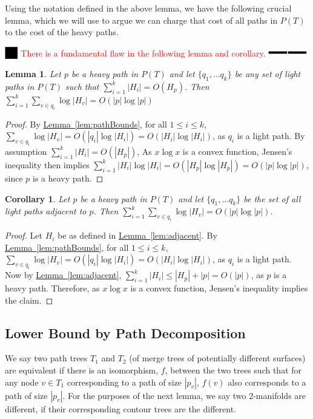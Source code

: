 \documentclass[11pt]{article}
\newtheorem{lemma}[theorem]{Lemma}
\newtheorem{corollary}[theorem]{Corollary}
\theoremstyle{definition}
\newcommand{\Lem}[1]{\hyperref[lem:#1]{Lemma~\ref*{lem:#1}}} %
\newcommand{\XSays}[2]{{
      {$\rule[-0.12cm]{0.2in}{0.5cm}$\fbox{\tt
            #1:} }
      \textcolor{red}{#2}
      \marginpar{\textcolor{blue}{#1}}
      {$\rule[0.1cm]{0.3in}{0.1cm}$\fbox{\tt
            end}$\rule[0.1cm]{0.3in}{0.1cm}$}
      }
   }
\newcommand{\Ben}[1]{{\XSays{Ben}{#1}}}
\begin{document}
Using the notation defined in the above lemma, we have the following crucial lemma, which we will use to 
argue we can charge that cost of all paths in $P(T)$ to the cost of the heavy paths.

\Ben{There is a fundamental flaw in the following lemma and corollary.}

\begin{lemma}
Let $p$ be a heavy path in $P(T)$ and let $\{q_1, \dots q_k\}$ be any set of light paths in $P(T)$ such that 
$\sum_{i=1}^k |H_i| = O(H_p)$.  Then $\sum_{i=1}^k \sum_{v\in q_i} \log |H_v| = O(|p|\log |p|)$
\end{lemma}
\begin{proof}
By \Lem{pathBounds}, for all $1\leq i\leq k$, 
 $\sum_{v\in q_i} \log |H_v| = O(|q_i|\log |H_i|) = O(|H_i|\log |H_i|)$, as $q_i$ is a light path.
 By assumption $\sum_{i=1}^k |H_i| = O(|H_p|)$, 
 As $x\log x$ is a convex function, Jensen's inequality then implies 
 $\sum_{i=1}^{k} |H_i|\log |H_i| = O(|H_p| \log |H_p|) = O(|p|\log |p|)$, since $p$ is a heavy path.
\end{proof}


\begin{corollary}
\label{cor:heavyLight}
 Let $p$ be a heavy path in $P(T)$ and let $\{q_1, \dots q_k\}$ be the set of all light paths adjacent to $p$.
 Then $\sum_{i=1}^k \sum_{v\in q_i} \log |H_v| = O(|p|\log |p|)$.
\end{corollary}
\begin{proof}
 Let $H_i$ be as defined in \Lem{adjacent}.  By \Lem{pathBounds}, for all $1\leq i\leq k$, 
 $\sum_{v\in q_i} \log |H_v| = O(|q_i|\log |H_i|) = O(|H_i|\log |H_i|)$, as $q_i$ is a light path.
 Now by \Lem{adjacent}, $\sum_{i=1}^k |H_i| \leq |H_p|+|p| = O(|p|)$, as $p$ is a heavy path. 
 Therefore, as $x\log x$ is a convex function, Jensen's inequality implies the claim.
 
\end{proof}







\subsection{Lower Bound by Path Decomposition}
We say two path trees $T_1$ and $T_2$ (of merge trees of potentially different surfaces) are equivalent if there is an isomorphism, $f$,
between the two trees such that for any node $v\in T_1$ corresponding to a path of size $|p_v|$, $f(v)$ also corresponds to a path of size $|p_v|$.
For the purposes of the next lemma, we say two 2-manifolds are different, if their corresponding contour trees are the different.  
\end{document}
